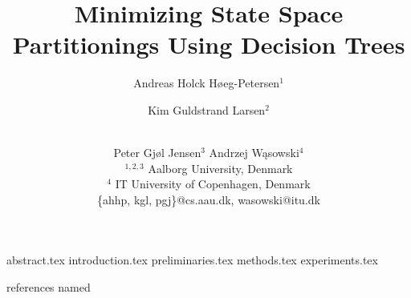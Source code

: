 \documentclass{article}
\title {Minimizing State Space Partitionings Using Decision Trees}
\author {%
    Andreas Holck Høeg-Petersen$^1$
    \and
    Kim Guldstrand Larsen$^2$\and\\
    Peter Gjøl Jensen$^{3}$\And
    Andrzej Wąsowski$^4$\\
    \affiliations
    $^{1,2,3}$ Aalborg University, Denmark\\
    $^4$ IT University of Copenhagen, Denmark\\
    \emails
    \{ahhp, kgl, pgj\}@cs.aau.dk,
    wasowski@itu.dk
}
\begin{document}
\maketitle

 {abstract.tex}
 {introduction.tex}
 {preliminaries.tex}
 {methods.tex}
 {experiments.tex}

\newpage

 {references}
 {named}


\end{document}
